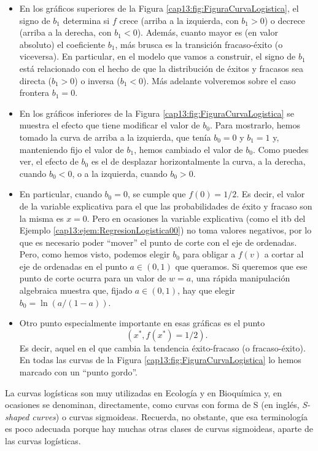\begin{itemize}

	\item En los gráficos superiores de la Figura \ref{cap13:fig:FiguraCurvaLogistica}, el signo de $b_1$ determina si $f$ crece (arriba a la izquierda, con $b_1>0$) o decrece (arriba a la derecha, con $b_1<0$). Además, cuanto mayor es (en valor absoluto) el coeficiente $b_1$, más brusca es la transición fracaso-éxito (o viceversa).   En particular, en el modelo que vamos a construir, el signo de $b_1$ está relacionado con el hecho de que la distribución de éxitos y fracasos sea directa ($b_1>0$) o inversa ($b_1<0$). Más adelante volveremos sobre el caso frontera $b_1 =0$.

	\item En los gráficos inferiores de la Figura \ref{cap13:fig:FiguraCurvaLogistica}	se muestra el efecto que tiene modificar el valor de $b_0$. Para mostrarlo, hemos tomado la curva de arriba a la izquierda, que tenía $b_0=0$ y $b_1=1$ y, manteniendo fijo el valor de $b_1$, hemos cambiado el valor de $b_0$. Como puedes ver, el efecto de $b_0$ es el de desplazar horizontalmente la curva, a la derecha, cuando $b_0<0$, o a la izquierda, cuando $b_0>0$.

	 \item En particular, cuando $b_0=0$, se cumple que $f(0)=1/2$. Es decir, el valor de la variable explicativa para el que las probabilidades de éxito y fracaso son la misma es $x=0$. Pero en ocasiones la variable explicativa (como el itb del Ejemplo  \ref{cap13:ejem:RegresionLogistica00}) no toma valores negativos, por lo que es necesario poder ``mover'' el punto de corte con el eje de ordenadas. Pero, como hemos visto, podemos elegir $b_0$ para obligar a $f(v)$ a cortar al eje de ordenadas en el punto $a\in(0,1)$ que queramos. Si queremos que ese punto de corte ocurra para un valor de $w=a$, una rápida manipulación algebraica muestra que, fijado $a\in(0,1)$, hay que elegir $b_0=\ln(a/(1-a))$.

	 \item Otro punto especialmente importante en esas gráficas es el punto
	 $$(x^*, f(x^*)=1/2).$$
	 Es decir, aquel en el que cambia la tendencia éxito-fracaso (o fracaso-éxito). En todas las curvas de la Figura \ref{cap13:fig:FiguraCurvaLogistica} lo hemos marcado con un ``punto gordo''.

\end{itemize}

La curvas logísticas son muy utilizadas en Ecología y en Bioquímica y, en ocasiones se denominan, directamente, como {\sf curvas con forma de S} (en ingl\'es,  {\em S-shaped curves}) o {\sf curvas sigmoideas}. Recuerda, no obstante, que esa terminología es poco adecuada porque hay muchas otras clases de curvas sigmoideas, aparte de las curvas logísticas.


